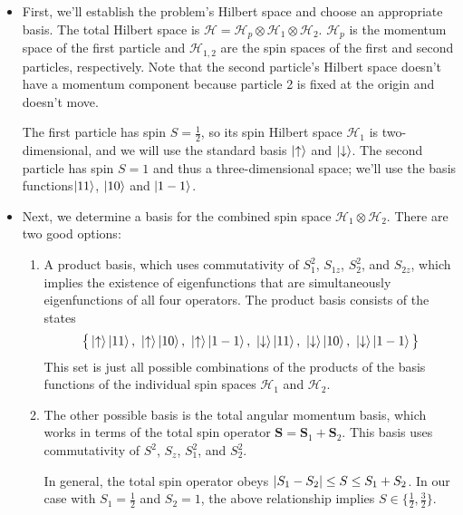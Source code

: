 \documentclass[11pt, a4paper]{article}
\renewcommand{\vec}[1]{\bm{#1}} %
\renewcommand{\H}{\mathcal{H}}  %
\newcommand{\ua}{\uparrow}  %
\newcommand{\da}{\downarrow}  %
\begin{document}
\begin{itemize}
	\item First, we'll establish the problem's Hilbert space and choose an appropriate basis. The total Hilbert space is $ \H = \H_{p} \otimes \H_{1} \otimes \H_{2} $. $ \H_{p} $ is the momentum space of the first particle and $ \H_{1,2} $  are the spin spaces of the first and second particles, respectively. Note that the second particle's Hilbert space doesn't have a momentum component because particle 2 is fixed at the origin and doesn't move.
	
	The first particle has spin $ S = \frac{1}{2} $, so its spin Hilbert space $ \H_{1} $ is two-dimensional, and we will use the standard basis $ \ket{\ua} $ and $ \ket{\da} $. The second particle has spin $ S = 1 $ and thus a three-dimensional space; we'll use the basis functions$ \ket{11} $, $ \ket{10} $ and $ \ket{1-1} $.
	
	\item Next, we determine a basis for the combined spin space $ \H_{1} \otimes \H_{2} $. There are two good options:
	\begin{enumerate}
		\item A product basis, which uses commutativity of $ S_{1}^{2} $, $ S_{1z} $, $ S_{2}^{2} $, and $ S_{2z} $, which implies the existence of eigenfunctions that are simultaneously eigenfunctions of all four operators. The product basis consists of the states 
		\begin{equation*}
			\big\{\ket{\ua}\ket{11},\ \ket{\ua}\ket{10},\ \ket{\ua}\ket{1-1},\ \ket{\da}\ket{11},\ \ket{\da}\ket{10},\ \ket{\da}\ket{1-1}   \big\}
		\end{equation*}
		This set is just all possible combinations of the products of the basis functions of the individual spin spaces $ \H_{1} $ and $ \H_{2} $.
		
		\item The other possible basis is the total angular momentum basis, which works in terms of the total spin operator $ \vec{S} = \vec{S}_{1} + \vec{S}_{2} $. This basis uses commutativity of $ S^{2} $, $ S_{z} $, $ S_{1}^{2} $, and $ S_{2}^{2} $.
			
		In general, the total spin operator obeys $ \abs{S_{1} - S_{2}} \leq S \leq S_{1} + S_{2} $. In our case with $ S_{1} = \frac{1}{2} $  and $ S_{2} = 1 $, the above relationship implies $ S \in \big\{ \frac{1}{2}, \frac{3}{2} \big\} $.
			

\end{enumerate}
\end{itemize}
\end{document}
